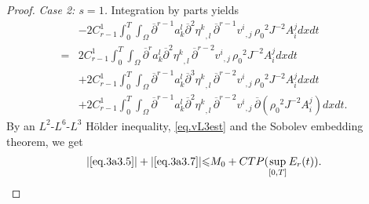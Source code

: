 \documentclass[12pt,twoside,reqno]{amsart}
\numberwithin{equation}{section}
\theoremstyle{definition}
\theoremstyle{remark}
\begin{document}
\begin{proof}
\emph{Case 2: $s=1$.} Integration by parts yields
\begin{align}
  &-2C_{r-1}^1{\int_0^T\!\!\!\!\int_\Omega }{\overline{\partial}}^{r-1}  a_k^l{\overline{\partial}}^2 {{{\eta^k}}_{,{l}}\,}{{{{\overline{\partial}}^{r-1} v^i}}_{,{j}}\,}{\rho_0}^2 J^{-2}A^j_idxdt\label{eq.3a3.4}\\
  =& 2C_{r-1}^1{\int_0^T\!\!\!\!\int_\Omega }{\overline{\partial}}^r a_k^l{\overline{\partial}}^2 {{{\eta^k}}_{,{l}}\,}{{{{\overline{\partial}}^{r-2} v^i}}_{,{j}}\,}{\rho_0}^2 J^{-2}A^j_idxdt\label{eq.3a3.5}\\
  &+ 2C_{r-1}^1{\int_0^T\!\!\!\!\int_\Omega }{\overline{\partial}}^{r-1} a_k^l{\overline{\partial}}^3 {{{\eta^k}}_{,{l}}\,}{{{{\overline{\partial}}^{r-2} v^i}}_{,{j}}\,}{\rho_0}^2 J^{-2}A^j_idxdt\label{eq.3a3.6}\\
  &+ 2C_{r-1}^1{\int_0^T\!\!\!\!\int_\Omega }{\overline{\partial}}^{r-1} a_k^l{\overline{\partial}}^2 {{{\eta^k}}_{,{l}}\,}{{{{\overline{\partial}}^{r-2} v^i}}_{,{j}}\,}{\overline{\partial}}({\rho_0}^2 J^{-2}A^j_i)dxdt.\label{eq.3a3.7}
\end{align}
By an $L^2$-$L^6$-$L^3$ H\"older inequality, \eqref{eq.vL3est} and the Sobolev embedding theorem, we get
\begin{align*}
  {\vert{\eqref{eq.3a3.5}}\vert}+{\vert{\eqref{eq.3a3.7}}\vert}{\leqslant} M_0+CTP(\sup_{[0,T]}E_r(t)).
\end{align*}


\end{proof}
\end{document}
